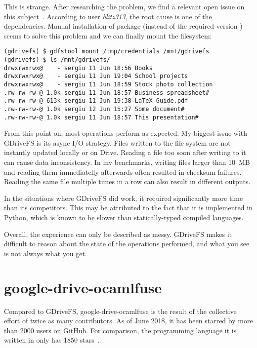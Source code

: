 This is strange. After researching the problem, we find a relevant open issue on this subject~\cite{gdrivefs_ssl_handshake_error}. According to user \emph{blitz313}, the root cause is one of the dependencies. Manual installation of package  (instead of the required version ) seems to solve this problem and we can finally mount the filesystem:

\begin{lstlisting}[frame=single,caption=GDriveFS filesystem mount]
(gdrivefs) $ gdfstool mount /tmp/credentials /mnt/gdrivefs
(gdrivefs) $ ls /mnt/gdrivefs/
drwxrwxrwx@    - sergiu 11 Jun 18:56 Books
drwxrwxrwx@    - sergiu 11 Jun 19:04 School projects
drwxrwxrwx@    - sergiu 11 Jun 18:59 Stock photo collection
.rw-rw-rw-@ 1.0k sergiu 11 Jun 18:57 Business spreadsheet#
.rw-rw-rw-@ 613k sergiu 11 Jun 19:38 LaTeX Guide.pdf
.rw-rw-rw-@ 1.0k sergiu 12 Jun 15:27 Some document#
.rw-rw-rw-@ 1.0k sergiu 11 Jun 18:57 This presentation#
\end{lstlisting}

From this point on, most operations perform as expected. My biggest issue with GDriveFS is its async I/O strategy. Files written to the file system are not instantly updated locally or on Drive. Reading a file too soon after writing to it can cause data inconsistency. In my benchmarks, writing files larger than \mbox{10 MB} and reading them immediatelly afterwards often resulted in checksum failures. Reading the same file multiple times in a row can also result in different outputs.

In the situations where GDriveFS did work, it required significantly more time than its competitors. This may be attributed to the fact that it is implemented in Python, which is known to be slower than statically-typed compiled languages.

Overall, the experience can only be described as messy. GDriveFS makes it difficult to reason about the state of the operations performed, and what you see is not always what you get.

\section{google-drive-ocamlfuse}

Compared to GDriveFS, google-drive-ocamlfuse is the result of the collective effort of twice as many contributors. As of June 2018, it has been starred by more than 2000 users on GitHub. For comparison, the programming language it is written in only has 1850 stars~\cite{ocaml}.

